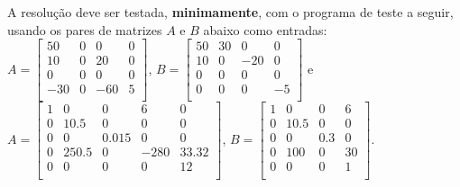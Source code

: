 \documentclass[a4paper,10pt]{article}
\begin{document}
A resolução deve ser testada, \textbf{minimamente}, com o programa de teste a seguir, usando os pares de matrizes $A$ e $B$ abaixo como entradas:
\\
$A = \begin{bmatrix}
50 & 0 & 0 & 0 \\
10 & 0 & 20 & 0 \\
0 & 0 & 0 & 0 \\
-30 & 0 & -60 & 5 \\
\end{bmatrix}$,
$
B = \begin{bmatrix}
50 & 30 & 0 & 0 \\
10 & 0 & -20 & 0 \\
0 & 0 & 0 & 0 \\
0 & 0 & 0 & -5 \\
\end{bmatrix}
$ e
\\
$A = \begin{bmatrix}
1 & 0 & 0 & 6 & 0 \\
0 & 10.5 & 0 & 0 & 0 \\
0 & 0 & 0.015 & 0 & 0 \\
0 & 250.5 & 0 & -280 & 33.32 \\
0 & 0 & 0 & 0 & 12 \\
\end{bmatrix}$,
$
B = \begin{bmatrix}
1 & 0 & 0 & 6 \\
0 & 10.5 & 0 & 0 \\
0 & 0 & 0.3 & 0 \\
0 & 100 & 0 & 30 \\
0 & 0 & 0 & 1 \\
\end{bmatrix}
$.
\end{document}
